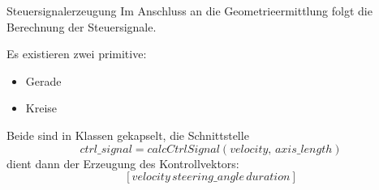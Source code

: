\begin{frame}{Steuersignalerzeugung}
Im Anschluss an die Geometrieermittlung folgt die Berechnung der Steuersignale.

Es existieren zwei primitive:
\begin{itemize}
\item Gerade
\item Kreise
\end{itemize}
Beide sind in Klassen gekapselt, die Schnittstelle
\[ctrl\_signal = calcCtrlSignal(velocity,\,axis\_length)\]
dient dann der Erzeugung des Kontrollvektors:
\[[velocity\,steering\_angle\,duration]\]
\end{frame}